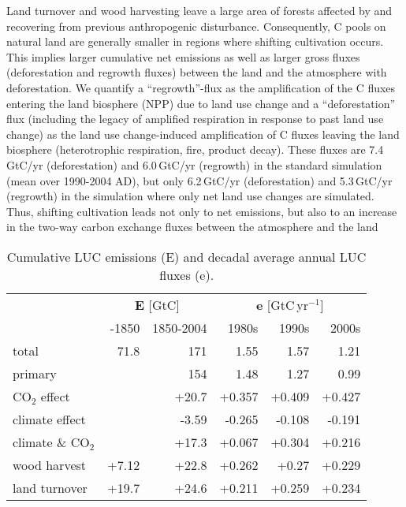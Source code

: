Land turnover and wood harvesting leave a large area of forests affected by and recovering from previous anthropogenic disturbance. Consequently, C pools on natural land are generally smaller in regions where shifting cultivation occurs. This implies larger cumulative net emissions as well as larger gross fluxes (deforestation and regrowth fluxes) between the land and the atmosphere with deforestation. We quantify a ``regrowth''-flux as the amplification of the C fluxes entering the land biosphere (NPP) due to land use change and a ``deforestation'' flux (including the legacy of amplified respiration in response to past land use change) as the land use change-induced amplification of C fluxes leaving the land biosphere (heterotrophic respiration, fire, product decay). These fluxes are 7.4\,GtC/yr (deforestation) and 6.0\,GtC/yr (regrowth) in the standard simulation (mean over 1990-2004 AD), but only 6.2\,GtC/yr (deforestation) and 5.3\,GtC/yr (regrowth) in the simulation where only net land use changes are simulated. Thus, shifting cultivation leads not only to net emissions, but also to an increase in the two-way carbon exchange fluxes between the atmosphere and the land
\begin{table}
 \caption[Cumulative LUC emissions and decadal average annual LUC fluxes]{Cumulative LUC emissions (E) and decadal average annual LUC fluxes (e).}
 \centering
 \small\sffamily
 \begin{tabular}{l r r r r r}
  \hline
   &			\multicolumn{2}{c}{{\bf E} [GtC]} & \multicolumn{3}{c}{{\bf e} [GtC\,yr$^{-1}$]}\\
   \cline{2-3} \cline{4-6}
   &			-1850 &	     1850-2004 &	1980s &	1990s &	2000s \\
  \hline
  total           &      71.8 &            171 &         1.55 &  1.57 &    1.21\\
  primary         &           &            154 &         1.48 &  1.27 &    0.99\\
  \hline
  CO$_2$ effect&               &         +20.7 &       +0.357 &+0.409 &   +0.427\\
  climate effect&              &         -3.59 &       -0.265 &-0.108 &   -0.191\\
  climate \& CO$_2$&           &         +17.3 &       +0.067 &+0.304 &   +0.216\\
  \hline
  wood harvest  &        +7.12 &        +22.8 &        +0.262 & +0.27 &+0.229\\
  land turnover &        +19.7 &        +24.6 &        +0.211 &+0.259 &+0.234\\
  \hline
 \end{tabular}
  \label{tab:hist}
\end{table}

